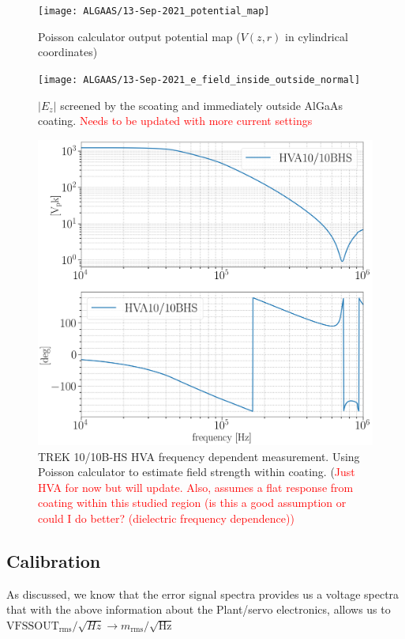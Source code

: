 \begin{figure}[H]
\texttt{[image: ALGAAS/13-Sep-2021\_potential\_map]}
\caption{Poisson calculator output potential map ($V(z,r)$ in cylindrical coordinates)}
\label{fig:poisson_calc_output}
\end{figure}

\begin{figure}[H]
\texttt{[image: ALGAAS/13-Sep-2021\_e\_field\_inside\_outside\_normal]}
\caption{$|E_z|$ screened by the scoating and immediately outside AlGaAs coating. \textcolor{red}{Needs to be updated with more current settings}}


\label{fig:Ez}
\end{figure}

\begin{figure}[H]
\centering
\includegraphics[width=.75\textwidth]{figs/ALGAAS/HVA_TREK1010BHS_1260V_out.png}
\caption{TREK 10/10B-HS HVA frequency dependent measurement. Using Poisson calculator to estimate field strength within coating. (\textcolor{red}{Just HVA for now but will update.} \textcolor{red}{Also, assumes a flat response from coating within this studied region (is this a good assumption or could I do better? (dielectric frequency dependence))}}
\label{fig:Ez}
\end{figure}

\subsection{Calibration}
As discussed, we know that the error signal spectra provides us a voltage spectra that with the above information about the Plant/servo electronics, allows us to
$\mathrm{VFSSOUT}_\mathrm{rms}/\sqrt{Hz} \rightarrow m_\mathrm{rms}/\sqrt{\mathrm{Hz}}$

